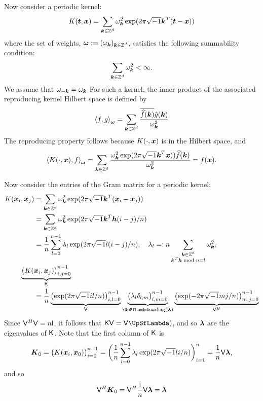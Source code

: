 \documentclass{amsart}
\begin{document}
Now consider a periodic kernel:
\begin{equation*}
    K(\vt,\vx) = \sum_{\vk \in \integers^d} \omega_{\vk}^2 \exp(2 \pi \sqrt{-1} \vk^T (\vt - \vx))
\end{equation*}
where the set of weights, $\vomega : = (\omega_{\vk})_{\vk \in \integers^d}$, satisfies the following summability condition:
\begin{equation*}
    \sum_{\vk \in \integers^d} \omega_{\vk}^2 < \infty.
\end{equation*}
We assume that $\omega_{-\vk} = \omega_{\vk}$ For such a kernel, the inner product of the associated reproducing kernel Hilbert space is defined by 
\begin{equation*}
    \ip[\vomega]{f}{g} = \sum_{\vk \in \integers^d} 
    \frac{\overline{\hf(\vk)} \hg(\vk)}{\omega_{\vk}^2}
\end{equation*}
The reproducing property follows because $K(\cdot,\vx)$ is in the Hilbert space, and 
\begin{equation*}
    \ip[\vomega]{K(\cdot,\vx)}{f} 
    = \sum_{\vk \in \integers^d} 
    \frac{ \omega_{\vk}^2 \exp(2 \pi \sqrt{-1} \vk^T \vx)) \hf(\vk)}{\omega_{\vk}^2} = f(\vx).
\end{equation*}

Now consider the entries of the Gram matrix for a periodic kernel:
\begin{align*}
    K(\vx_i,\vx_j)  &= \sum_{\vk \in \integers^d} \omega_{\vk}^2 \exp(2 \pi \sqrt{-1} \vk^T(\vx_i - \vx_j)) \\
    & = \sum_{\vk \in \integers^d} \omega_{\vk}^2 \exp(2 \pi \sqrt{-1} \vk^T \vh (i-j)/n) \\
    & = \frac 1n \sum_{l = 0}^{n-1} \lambda_l \exp(2 \pi \sqrt{-1} l (i-j)/n), \quad \lambda_l =: n\sum_{\substack{\vk \in \integers^d \\ \vk^T\vh \bmod n = l}} \omega_{\vk}^2, \\
    \MoveEqLeft \underbrace{\bigl ( K(\vx_i,\vx_j)\bigr)_{i,j = 0}^{n-1}}_{\mK} \\
    &
    = \frac 1n \underbrace{\bigl ( \exp(2 \pi \sqrt{-1} il/n) \bigr)_{i,l = 0}^{n-1}}_{\mV} 
    \underbrace{\bigl ( \lambda_l \delta_{l,m} \bigr)_{l,m = 0}^{n-1}}_{\mLambda = \diag(\vlambda)} 
    \underbrace{\bigl ( \exp(- 2 \pi \sqrt{-1} mj/n) \bigr)_{m,j = 0}^{n-1}}_{\mV^H}
\end{align*}
Since $\mV^H \mV = n \mI$, it follows that $\mK \mV  =\mV \mLambda)$, and so $\vlambda$ are the eigenvalues of $\mK$.  Note that the first column of $\mK$ is 
\begin{equation*}
    \vK_0 = \bigl ( K(\vx_i,\vx_0)\bigr)_{i = 0}^{n-1}
    = \biggl( \frac 1n \sum_{l = 0}^{n-1} \lambda_l \exp(2 \pi \sqrt{-1} l i/n)\biggr)_{i=1}^n = \frac 1n \mV \vlambda,
\end{equation*}
and so 
\begin{equation*}
    \mV^{H} \vK_0 = \mV^{H} \frac 1n \mV \vlambda = \vlambda 
\end{equation*}
\end{document}

